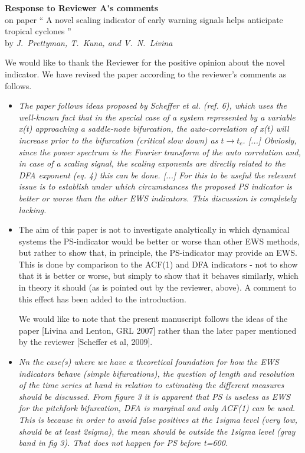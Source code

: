 \documentclass[12pt]{article}
\begin{document}
\begin{center}
{\bf Response to Reviewer A's comments}\\
on paper `` A novel scaling indicator of early warning signals 
helps anticipate tropical cyclones ''\\[5pt]
by {\it J.~Prettyman, T.~Kuna, and V.~N.~Livina}
\end{center}

\vspace{3mm}

\noindent We would like to thank the Reviewer for the positive
opinion about the novel indicator. We have revised the paper according to 
the reviewer's comments as follows.

\begin{itemize}
\item[\bf Comment 1.] 
{\sl
The paper follows ideas proposed by Scheffer et al. (ref. 6), 
which uses the well-known fact that in the special case of a 
system represented by a variable x(t) approaching a saddle-node 
bifurcation, the auto-correlation of x(t) will increase prior 
to the bifurcation (critical slow down) as $t \rightarrow t_c$. 
[...] Obviosly, 
since the power spectrum is the Fourier transform of the auto correlation 
and, in case of a scaling signal, the scaling exponents are 
directly related to the DFA exponent (eq. 4) this can be done.
[...] For this to be useful the relevant 
issue is to establish under which circumstances the proposed PS 
indicator is better or worse than the other EWS indicators. 
This discussion is completely lacking. }

\item[\bf Response.] 
The aim of this paper is not to investigate analytically in which 
dynamical systems the PS-indicator would be better or worse than other 
EWS methods, but rather to show that, in principle, the PS-indicator 
may provide an EWS. This is done by comparison to the ACF(1) and 
DFA indicators - not to show that it is better or worse, but simply 
to show that it behaves similarly, which in theory it should 
(as is pointed out by the reviewer, above). 
A comment to this effect has been added to the introduction.

We would like to note that the present manuscript follows the ideas 
of the paper [Livina and Lenton, GRL 2007] rather than the later paper 
mentioned by the reviewer [Scheffer et al, 2009].

\item[\bf Comment 2.]
{\sl 
Nn the case(s) where we have a theoretical foundation for 
how the EWS indicators behave (simple bifurcations), 
the question of length and resolution of the time series at 
hand in relation to estimating the different measures should be discussed. 
From figure 3 it is apparent that PS is useless as EWS for the 
pitchfork bifurcation, DFA is marginal and only ACF(1) can be used. 
This is because in order to avoid false positives at the 1sigma level 
(very low, should be at least 2sigma), the mean should be outside 
the 1sigma level (gray band in fig 3). 
That does not happen for PS before t=600.  
}


\end{itemize}
\end{document}
